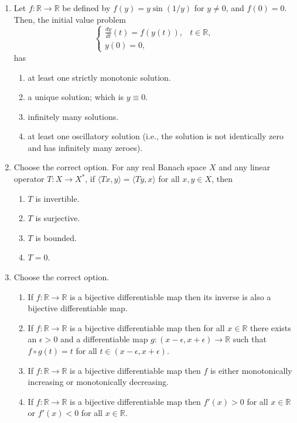 \documentclass[11pt, a4paper]{article}
\begin{document}
\begin{enumerate}
  \item Let $f: \mathbb{R} \to \mathbb{R}$ be defined by $f(y) = y \sin(1/y)$ for $y \ne 0$, and $f(0) = 0$. Then, the initial value problem
  \[
    \begin{cases}
      \frac{dy}{dt}(t) = f(y(t)), & t \in \mathbb{R}, \\
      y(0) = 0,
    \end{cases}
  \]
  has
  \begin{enumerate}[label=(\alph*)]
    \item at least one strictly monotonic solution.
    \item a unique solution; which is $y \equiv 0$.
    \item infinitely many solutions.
    \item at least one oscillatory solution (i.e., the solution is not identically zero and has infinitely many zeroes).
  \end{enumerate}

  \item Choose the correct option. For any real Banach space $X$ and any linear operator $T: X \to X^*$, if $\langle Tx, y \rangle = \langle Ty, x \rangle$ for all $x, y \in X$, then
  \begin{enumerate}[label=(\alph*)]
    \item $T$ is invertible.
    \item $T$ is surjective.
    \item $T$ is bounded.
    \item $T = 0$.
  \end{enumerate}

  \item Choose the correct option.
  \begin{enumerate}[label=(\alph*)]
    \item If $f: \mathbb{R} \to \mathbb{R}$ is a bijective differentiable map then its inverse is also a bijective differentiable map.
    \item If $f: \mathbb{R} \to \mathbb{R}$ is a bijective differentiable map then for all $x \in \mathbb{R}$ there exists an $\epsilon > 0$ and a differentiable map $g: (x - \epsilon, x + \epsilon) \to \mathbb{R}$ such that $f \circ g(t) = t$ for all $t \in (x - \epsilon, x + \epsilon)$.
    \item If $f: \mathbb{R} \to \mathbb{R}$ is a bijective differentiable map then $f$ is either monotonically increasing or monotonically decreasing.
    \item If $f: \mathbb{R} \to \mathbb{R}$ is a bijective differentiable map then $f'(x) > 0$ for all $x \in \mathbb{R}$ or $f'(x) < 0$ for all $x \in \mathbb{R}$.
  \end{enumerate}


\end{enumerate}
\end{document}
